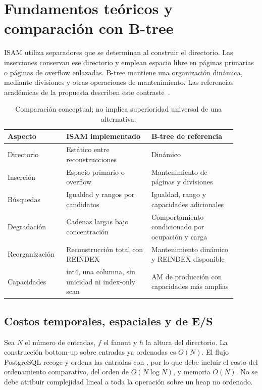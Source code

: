 \documentclass[11pt,a4paper]{article}
\newcommand{\code}[1]{\texttt{\detokenize{#1}}}
\begin{document}
\section{Fundamentos teóricos y comparación con B-tree}

ISAM utiliza separadores que se determinan al construir el directorio. Las
inserciones conservan ese directorio y emplean espacio libre en páginas primarias
o páginas de overflow enlazadas. B-tree mantiene una organización dinámica,
mediante divisiones y otras operaciones de mantenimiento. Las referencias
académicas de la propuesta describen este
contraste~\cite{ramakrishnan,silberschatz,silberschatz2014}.

\begin{table}[htbp]
\centering\small
\begin{tabular}{P{0.22\linewidth}P{0.34\linewidth}P{0.34\linewidth}}
\toprule
Aspecto & ISAM implementado & B-tree de referencia\\
\midrule
Directorio & Estático entre reconstrucciones & Dinámico\\
Inserción & Espacio primario o overflow & Mantenimiento de páginas y divisiones\\
Búsquedas & Igualdad y rangos por candidatos & Igualdad, rango y capacidades adicionales\\
Degradación & Cadenas largas bajo concentración & Comportamiento condicionado por ocupación y carga\\
Reorganización & Reconstrucción total con REINDEX & Mantenimiento dinámico y REINDEX disponible\\
Capacidades & int4, una columna, sin unicidad ni index-only scan
            & AM de producción con capacidades más amplias\\
\bottomrule
\end{tabular}
\caption{Comparación conceptual; no implica superioridad universal de una alternativa.}
\end{table}

\subsection{Costos temporales, espaciales y de E/S}

Sea $N$ el número de entradas, $f$ el fanout y $h$ la altura del directorio. La
construcción bottom-up sobre entradas ya ordenadas es $O(N)$. El flujo PostgreSQL
recoge y ordena las entradas con \code{qsort}, por lo que debe incluir el costo del
ordenamiento comparativo, del orden de $O(N\log N)$, y memoria $O(N)$. No se debe
atribuir complejidad lineal a toda la operación \code{CREATE INDEX} sobre un heap
no ordenado.
\end{document}
